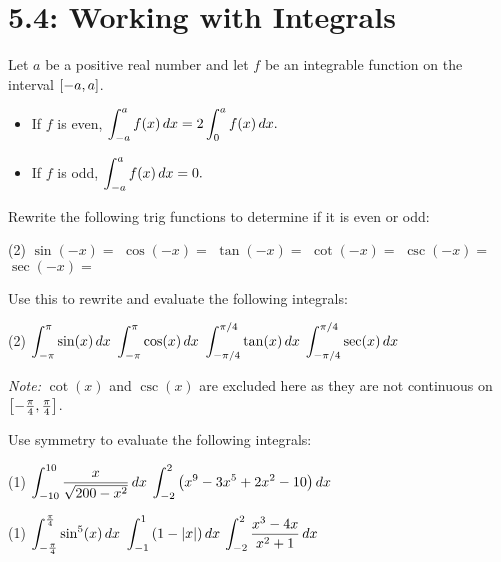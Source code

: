 \documentclass[mathNotesPreamble]{subfiles}
\begin{document}
\section{5.4: Working with Integrals}

\begin{thmBox*}
  Let $a$ be a positive real number and let $f$ be an integrable function on the interval ${\left[-a,a\right]}$.
  \begin{itemize}
    \item If $f$ is even, $\displaystyle\int_{-a}^a f(x)\,dx=2\int_{0}^a f(x)\,dx.$
    \item If $f$ is odd, $\displaystyle\int_{-a}^a f(x)\,dx=0.$
  \end{itemize}
\end{thmBox*}

\begin{ex*}
  Rewrite the following trig functions to determine if it is even or odd:
  \begin{tasks}[label=\mbox{}](2)
    \task $\sin(-x)=$
    \task $\cos(-x)=$
    \task $\tan(-x)=$
    \task $\cot(-x)=$
    \task $\csc(-x)=$
    \task $\sec(-x)=$
  \end{tasks}
  Use this to rewrite and evaluate the following integrals:
\end{ex*}
\begin{tasks}[after-item-skip=\stretch{1}, label=\mbox{}](2)
  \task $\displaystyle\int_{-\pi}^\pi \sin(x)\,dx$
  \task $\displaystyle\int_{-\pi}^\pi \cos(x)\,dx$
  \task $\displaystyle\int_{-\pi/4}^{\pi/4} \tan(x)\,dx$
  \task $\displaystyle\int_{-\pi/4}^{\pi/4} \sec(x)\,dx$
\end{tasks}
\textit{Note:} $\cot(x)$ and $\csc(x)$ are excluded here as they are not continuous on ${\left[-\frac{\pi}{4},\frac{\pi}{4}\right]}$.

\vspace*{-\baselineskip}
\pagebreak

\begin{ex*}
  Use symmetry to evaluate the following integrals:
\end{ex*}
\begin{tasks}[after-item-skip=\stretch{1}](1)
  \task $\displaystyle\int_{-10}^{10} \frac{x}{\sqrt{200-x^2}}\,dx$
  \task $\displaystyle\int_{-2}^{2}{\left(x^9-3x^5+2x^2-10\right)}\,dx$
\end{tasks}
\pagebreak

\begin{tasks}[after-item-skip=\stretch{1}, resume](1)
  \task $\displaystyle\int_{-\frac{\pi}{4}}^{\frac{\pi}{4}}\sin^5(x)\,dx$
  \task $\displaystyle\int_{-1}^{1}{\left(1-{\left\vert x\right\vert}\right)}\,dx$
  \task $\displaystyle\int_{-2}^{2}\frac{x^3-4x}{x^2+1}\,dx$
\end{tasks}
\pagebreak
\end{document}
